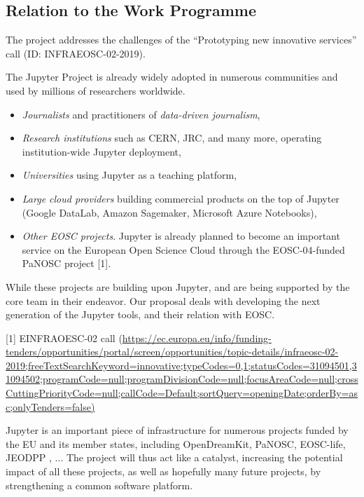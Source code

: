 \subsection{Relation to the Work Programme}

The \TheProject project addresses the challenges of the ``Prototyping
new innovative services'' call (ID: INFRAEOSC-02-2019).

The Jupyter Project is already widely adopted in numerous communities and used by millions of researchers worldwide.

\begin{itemize}
\item \emph{Journalists} and practitioners of \emph{data-driven journalism},
\item \emph{Research institutions} such as CERN, JRC, and many more, operating institution-wide Jupyter deployment,
\item \emph{Universities} using Jupyter as a teaching platform,
\item \emph{Large cloud providers} building commercial products on the top of Jupyter (Google DataLab, Amazon Sagemaker, Microsoft Azure Notebooks),
\item \emph{Other EOSC projects}. Jupyter is already planned to become an important service on the European Open Science Cloud through the EOSC-04-funded PaNOSC project [1].
\end{itemize}

While these projects are building upon Jupyter, and are being
supported by the core team in their endeavor. Our proposal deals with
developing the next generation of the Jupyter tools, and their
relation with EOSC.

[1] EINFRAOESC-02 call (\url{https://ec.europa.eu/info/funding-tenders/opportunities/portal/screen/opportunities/topic-details/infraeosc-02-2019;freeTextSearchKeyword=innovative;typeCodes=0,1;statusCodes=31094501,31094502;programCode=null;programDivisionCode=null;focusAreaCode=null;crossCuttingPriorityCode=null;callCode=Default;sortQuery=openingDate;orderBy=asc;onlyTenders=false)}

Jupyter is an important piece of infrastructure for numerous projects funded
by the EU and its member states, including OpenDreamKit, PaNOSC, EOSC-life,
JEODPP \cite{Soille2018}, ... The \TheProject project
will thus act like a catalyst, increasing the potential impact of all these
projects, as well as hopefully many future projects, by strengthening a common
software platform.

